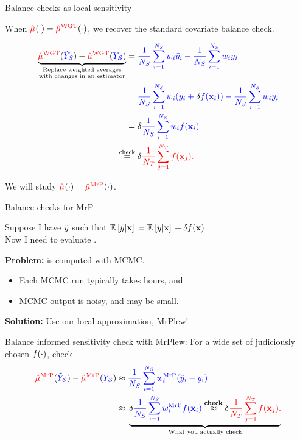 
\begin{frame}[t]{Balance checks as local sensitivity}


When $\tarcol{\muhat}(\cdot) = \muhatcw[\cdot]$,
we recover the standard covariate balance check.

$$
\begin{aligned}
    \underbrace{
        \muhatcw[\Ytil] - \muhatcw
    }_{
        \substack{
            \text{Replace weighted averages} \\
            \text{with changes in an estimator}
        }
    }
    ={}&
    \surcol{\meansur \w_i \ytil_i - \meansur \w_i \y_i}
    \\={}&
    \surcol{\meansur \w_i (\y_i + \textcolor{black}{\deltaf} 
        \f(\x_i)) - \meansur \w_i \y_i}
    \\={}&
    \deltaf \surcol{\meansur \w_i \f(\x_i)}
    \\\eqcheck{}&
    \tarcol{\deltaf \meantar f(\x_j).}
\end{aligned}
$$


We will study $\tarcol{\muhat}(\cdot) = \muhatmrp[\cdot]$.

\end{frame}



\begin{frame}[t]{Balance checks for MrP}

Suppose I have
$\ytil$ such that $\expect{}{\ytil \vert \x} = \expect{}{\y \vert \x} + \deltaf f(\x)$.\\
Now I need to evaluate \surcol{$\muhatmrp[\Ytil] - \muhatmrp$}.
\pause

\textbf{Problem:} \surcol{$\muhatmrp[\cdot]$} is computed with MCMC.
%
\begin{itemize}
\item Each MCMC run typically takes hours, and
\item MCMC output is noisy, and \surcol{$\muhatmrp[\Ytil] - \muhatmrp$} may be small.
\end{itemize}
%
\pause
\textbf{Solution:} Use our local approximation, MrPlew!

\begin{block}{Balance informed sensitivity check with MrPlew:}
For a wide set of judiciously chosen $\f(\cdot)$, check
$$
\begin{aligned}
\muhatmrp[\Ytil] - \muhatmrp \approx{}&
    \surcol{\meansur \w_i^\mrp (\ytil_i - \y_i)}
    \\\approx{}&
    \underbrace{
        \deltaf  \surcol{\meansur \w_i^\mrp \f(\x_i)}
            \overset{\textrm{\textbf{check}}}{\approx}
        \deltaf \tarcol{\meantar f(\x_j).}
    }_{\textrm{What you actually check}}
\end{aligned}
$$
\end{block}

\end{frame}

